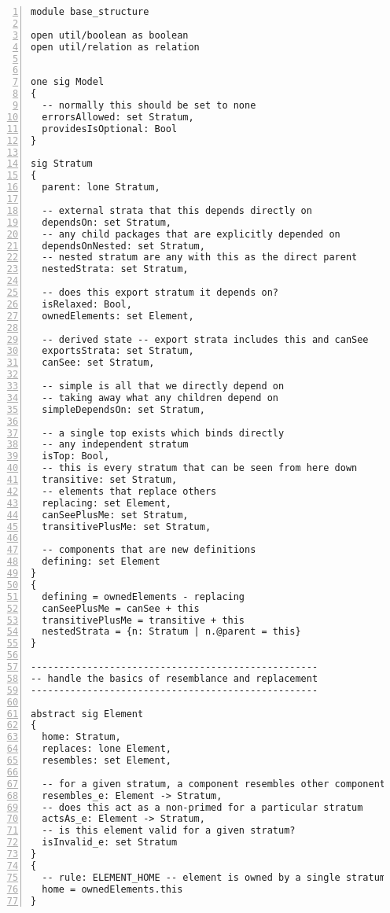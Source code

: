\lstset{frame=tb, aboveskip=12pt, belowskip=-3pt, breaklines=true, tabsize=2, mathescape=true}
\begin{lstlisting}[caption={base\_structure.als}, numbers=left]
module base_structure

open util/boolean as boolean
open util/relation as relation


one sig Model
{
  -- normally this should be set to none
  errorsAllowed: set Stratum,
  providesIsOptional: Bool
}

sig Stratum
{
  parent: lone Stratum,
  
  -- external strata that this depends directly on
  dependsOn: set Stratum,
  -- any child packages that are explicitly depended on
  dependsOnNested: set Stratum,
  -- nested stratum are any with this as the direct parent
  nestedStrata: set Stratum,
  
  -- does this export stratum it depends on?
  isRelaxed: Bool,
  ownedElements: set Element,

  -- derived state -- export strata includes this and canSee
  exportsStrata: set Stratum,
  canSee: set Stratum,

  -- simple is all that we directly depend on
  -- taking away what any children depend on
  simpleDependsOn: set Stratum,

  -- a single top exists which binds directly
  -- any independent stratum
  isTop: Bool,
  -- this is every stratum that can be seen from here down
  transitive: set Stratum,
  -- elements that replace others
  replacing: set Element,
  canSeePlusMe: set Stratum,
  transitivePlusMe: set Stratum,

  -- components that are new definitions
  defining: set Element
}
{
  defining = ownedElements - replacing
  canSeePlusMe = canSee + this
  transitivePlusMe = transitive + this
  nestedStrata = {n: Stratum | n.@parent = this}
}

---------------------------------------------------
-- handle the basics of resemblance and replacement
---------------------------------------------------

abstract sig Element
{
  home: Stratum,
  replaces: lone Element,
  resembles: set Element,

  -- for a given stratum, a component resembles other components in a given stratum view
  resembles_e: Element -> Stratum,
  -- does this act as a non-primed for a particular stratum
  actsAs_e: Element -> Stratum,
  -- is this element valid for a given stratum?
  isInvalid_e: set Stratum
}
{
  -- rule: ELEMENT_HOME -- element is owned by a single stratum
  home = ownedElements.this
}
\end{lstlisting}
